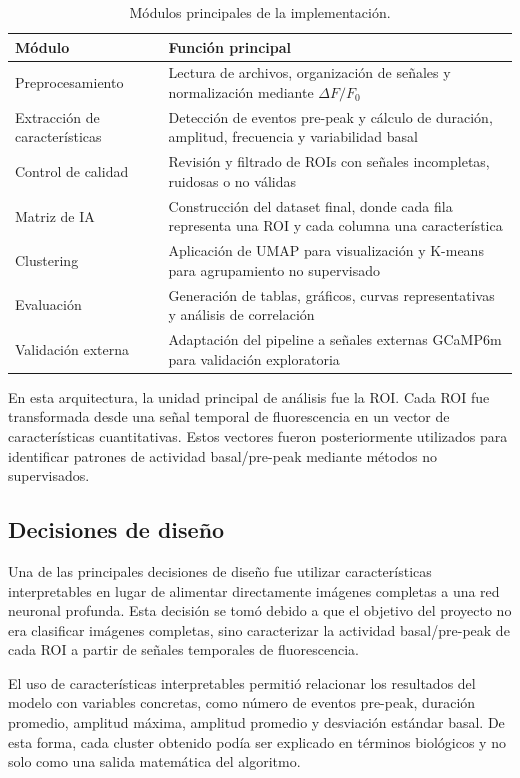 \documentclass[10pt,twocolumn]{article}
\begin{document}
\begin{table}[H]
\centering
\caption{Módulos principales de la implementación.}
\begin{tabular}{p{2.8cm}p{3.6cm}}
\toprule
\textbf{Módulo} & \textbf{Función principal} \\
\midrule
Preprocesamiento & Lectura de archivos, organización de señales y normalización mediante $\Delta F/F_0$ \\
Extracción de características & Detección de eventos pre-peak y cálculo de duración, amplitud, frecuencia y variabilidad basal \\
Control de calidad & Revisión y filtrado de ROIs con señales incompletas, ruidosas o no válidas \\
Matriz de IA & Construcción del dataset final, donde cada fila representa una ROI y cada columna una característica \\
Clustering & Aplicación de UMAP para visualización y K-means para agrupamiento no supervisado \\
Evaluación & Generación de tablas, gráficos, curvas representativas y análisis de correlación \\
Validación externa & Adaptación del pipeline a señales externas GCaMP6m para validación exploratoria \\
\bottomrule
\end{tabular}
\end{table}
En esta arquitectura, la unidad principal de análisis fue la ROI. Cada ROI fue transformada desde una señal temporal de fluorescencia en un vector de características cuantitativas. Estos vectores fueron posteriormente utilizados para identificar patrones de actividad basal/pre-peak mediante métodos no supervisados.

\subsection{Decisiones de diseño}

Una de las principales decisiones de diseño fue utilizar características interpretables en lugar de alimentar directamente imágenes completas a una red neuronal profunda. Esta decisión se tomó debido a que el objetivo del proyecto no era clasificar imágenes completas, sino caracterizar la actividad basal/pre-peak de cada ROI a partir de señales temporales de fluorescencia.

El uso de características interpretables permitió relacionar los resultados del modelo con variables concretas, como número de eventos pre-peak, duración promedio, amplitud máxima, amplitud promedio y desviación estándar basal. De esta forma, cada cluster obtenido podía ser explicado en términos biológicos y no solo como una salida matemática del algoritmo.
\end{document}
